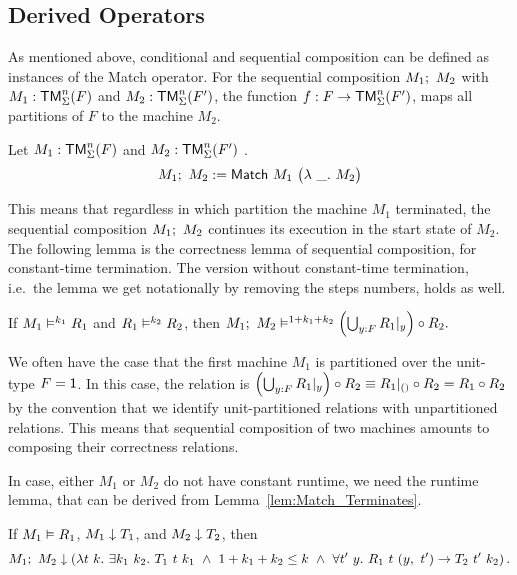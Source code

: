 \subsection{Derived Operators}
\label{sec:match-derived-operators}

As mentioned above, conditional and sequential composition can be defined as instances of the Match operator.  For the sequential composition
$M_1 ;~ M_2$ with $M_1 : \mathsf{TM}_\Sigma^n(F)$ and $M_2 : \mathsf{TM}_\Sigma^n(F')$, the function $f : F \rightarrow \mathsf{TM}_\Sigma^n(F')$, maps all partitions of $F$ to the
machine $M_2$.
%
\begin{definition}
  \label{def:Seq}
  Let $M_1 : \mathsf{TM}_\Sigma^n(F)$ and $M_2 : \mathsf{TM}_\Sigma^n(F')$ .
  \[
    M_1 ;~ M_2 := \mathsf{Match}~M_1~
    \bigl(
    \lambda~\_.~M_2
    \bigr)
  \]
\end{definition}
This means that regardless in which partition the machine $M_1$ terminated, the sequential composition $M_1 ;~ M_2$ continues its execution in the
start state of $M_2$.  The following lemma is the correctness lemma of sequential composition, for constant-time termination.  The version without
constant-time termination, i.e.\ the lemma we get notationally by removing the steps numbers, holds as well.

\begin{lemma}
  \label{lem:Seq_RealiseIn}
  If $M_1 \mathrel{\vDash^{k_1}} R_1$ and $R_1 \mathrel{\vDash^{k_2}} R_2$, then
  $
  M_1 ;~ M_2 \mathrel{\vDash^{1+k_1+k_2}} \left(\bigcup_{y:F} R_1{|}_{y}\right) \circ R_2.
  $
\end{lemma}

We often have the case that the first machine $M_1$ is partitioned over the unit-type $F = \mathsf{1}$.  In this case, the relation is
$\left(\bigcup_{y:F} R_1{|}_{y}\right) \circ R_2 \equiv R_1 {|}_{\mathsf{()}} \circ R_2 = R_1 \circ R_2$ by the convention that we identify unit-partitioned
relations with unpartitioned relations.  This means that sequential composition of two machines amounts to composing their correctness relations.

In case, either $M_1$ or $M_2$ do not have constant runtime, we need the runtime lemma, that can be derived from Lemma~\ref{lem:Match_Terminates}.
\begin{lemma}
  \label{lem:Seq_TerminatesIn}
  If $M_1 \mathrel{\vDash} R_1$, $M_1 \mathrel{\downarrow} T_1$, and $M_2 \mathrel{\downarrow} T_2$, then
  \[
    M_1 \Seq M_2 \TerminatesIn
    \left(%
      \lambda t~k.~\exists k_1~k_2.~T_1~t~k_1 ~\land~ 1 + k_1 + k_2 \leq k ~\land~ \forall t'~y.~R_1~t~(y,~t') \rightarrow T_2~t'~k_2 %
    \right).
  \]
\end{lemma}


